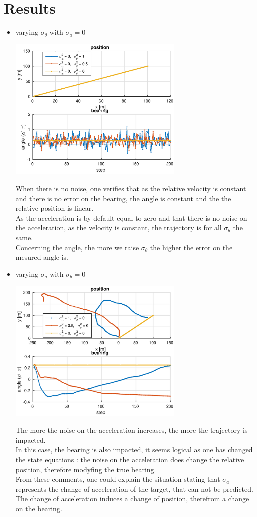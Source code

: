 \documentclass[english,DIV=13]{scrreprt}
\begin{document}
\section*{Results}
\begin{itemize}
\item varying $\sigma_\theta$ with $\sigma_a=0$
\begin{center}	
\includegraphics[width=0.66\textwidth]{img/q2_1.eps}
\end{center}
When there is no noise, one verifies that as the relative velocity is constant and there is no error on
the bearing, the angle is constant and the the relative position is linear.\\
As the acceleration is by default equal to zero and that there is no noise on the acceleration, as the velocity is
constant, the trajectory is for all $\sigma_{\theta}$ the same.\\
Concerning the angle, the more we raise $\sigma_{\theta}$ the higher the error on the mesured angle is.

\item varying $\sigma_a$ with $\sigma_\theta=0$
\begin{center}
\includegraphics[width=0.66\textwidth]{img/q2_2.eps}
\end{center}
The more the noise on the acceleration increases, the more the trajectory is impacted. \\
In this case, the bearing is also impacted, it seems logical as one has changed the state equations :
the noise on the acceleration does change the relative position, therefore modyfing the true bearing. \\
From these comments, one could explain the situation stating that $\sigma_a$ represents the change of 
acceleration of the target, that can not be predicted. The change of acceleration induces a change
of position, therefrom a change on the bearing.



\end{itemize}
\end{document}
